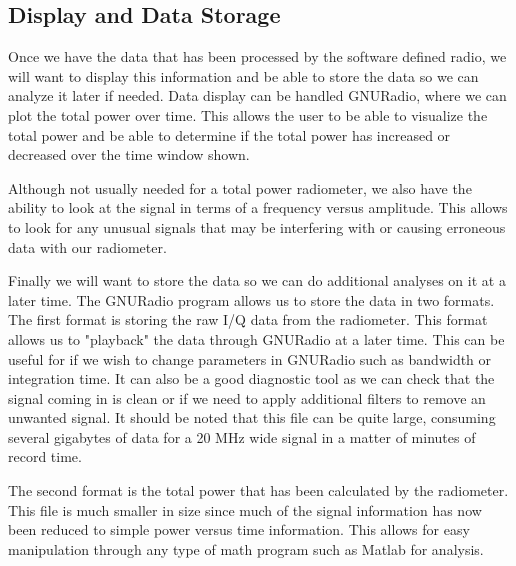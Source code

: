\subsection{Display and Data Storage}
Once we have the data that has been processed by the software defined radio, we will want to display this information and be able to store the data so we can analyze it later if needed.  Data display can be handled GNURadio, where we can plot the total power over time.  This allows the user to be able to visualize the total power and be able to determine if the total power has increased or decreased over the time window shown.  

Although not usually needed for a total power radiometer, we also have the ability to look at the signal in terms of a frequency versus amplitude.  This allows to look for any unusual signals that may be interfering with or causing erroneous data with our radiometer.  

Finally we will want to store the data so we can do additional analyses on it at a later time.  The GNURadio program allows us to store the data in two formats.  The first format is storing the raw I/Q data from the radiometer.  This format allows us to "playback" the data through GNURadio at a later time.  This can be useful for if we wish to change parameters in GNURadio such as bandwidth or integration time.  It can also be a good diagnostic tool as we can check that the signal coming in is clean or if we need to apply additional filters to remove an unwanted signal. It should be noted that this file can be quite large, consuming several gigabytes of data for a 20 MHz wide signal in a matter of minutes of record time.

The second format is the total power that has been calculated by the radiometer.  This file is much smaller in size since much of the signal information has now been reduced to simple power versus time information.  This allows for easy manipulation through any type of math program such as Matlab for analysis.  